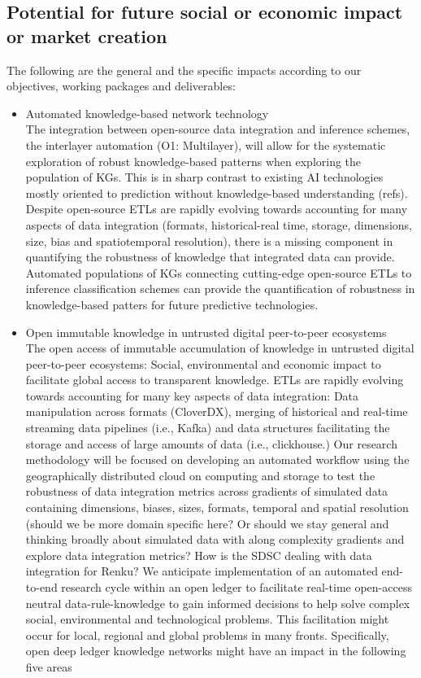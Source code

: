 \documentclass[12pt, a4paper]{article} %
\begin{document}
\subsection{Potential for future social or economic impact or market
  creation}

The following are the general and the specific impacts according to
our objectives, working packages and deliverables:

\begin{itemize}
\item Automated knowledge-based network technology\\ The integration between open-source
data integration and inference schemes, the interlayer automation (O1:
Multilayer), will allow for the systematic exploration of robust
knowledge-based patterns when exploring the population of KGs. This is
in sharp contrast to existing AI technologies mostly oriented to
prediction without knowledge-based understanding (refs). Despite
open-source ETLs are rapidly evolving towards accounting for many
aspects of data integration (formats, historical-real time, storage,
dimensions, size, bias and spatiotemporal resolution), there is a
missing component in quantifying the robustness of knowledge that
integrated data can provide. Automated populations of KGs connecting
cutting-edge open-source ETLs to inference classification schemes can
provide the quantification of robustness in knowledge-based patters
for future predictive technologies.

\item Open immutable knowledge in untrusted digital peer-to-peer
  ecosystems\\
  The open access of immutable accumulation of knowledge in untrusted
  digital peer-to-peer ecosystems: Social, environmental and economic
  impact to facilitate global access to transparent knowledge.  ETLs
  are rapidly evolving towards accounting for many key aspects of data
  integration: Data manipulation across formats (CloverDX), merging of
  historical and real-time streaming data pipelines (i.e., Kafka) and
  data structures facilitating the storage and access of large amounts
  of data (i.e., clickhouse.) Our research methodology will be focused
  on developing an automated workflow using the geographically
  distributed cloud on computing and storage to test the robustness of
  data integration metrics across gradients of simulated data
  containing dimensions, biases, sizes, formats, temporal and spatial
  resolution (should we be more domain specific here? Or should we
  stay general and thinking broadly about simulated data with along
  complexity gradients and explore data integration metrics? How is
  the SDSC dealing with data integration for Renku?  We anticipate
  implementation of an automated end-to-end research cycle within an
  open ledger to facilitate real-time open-access neutral
  data-rule-knowledge to gain informed decisions to help solve complex
  social, environmental and technological problems. This facilitation
  might occur for local, regional and global problems in many
  fronts. Specifically, open deep ledger knowledge networks might have
  an impact in the following five areas


\end{itemize}
\end{document}
